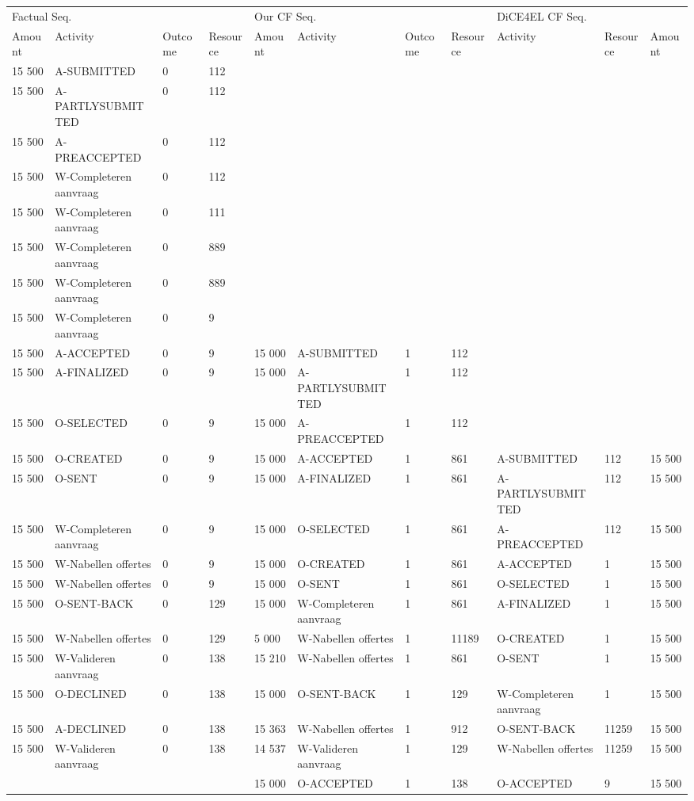 \begin{tabular}{lllllllllll}
\toprule
\multicolumn{4}{l}{Factual Seq.} & \multicolumn{4}{l}{Our CF Seq.} & \multicolumn{3}{l}{DiCE4EL CF Seq.} \\
Amount & Activity & Outcome & Resource & Amount & Activity & Outcome & Resource & Activity & Resource & Amount \\
\midrule
15 500 & A-SUBMITTED & 0 & 112 &  &  &  &  &  &  &  \\
15 500 & A-PARTLYSUBMITTED & 0 & 112 &  &  &  &  &  &  &  \\
15 500 & A-PREACCEPTED & 0 & 112 &  &  &  &  &  &  &  \\
15 500 & W-Completeren aanvraag & 0 & 112 &  &  &  &  &  &  &  \\
15 500 & W-Completeren aanvraag & 0 & 111 &  &  &  &  &  &  &  \\
15 500 & W-Completeren aanvraag & 0 & 889 &  &  &  &  &  &  &  \\
15 500 & W-Completeren aanvraag & 0 & 889 &  &  &  &  &  &  &  \\
15 500 & W-Completeren aanvraag & 0 & 9 &  &  &  &  &  &  &  \\
15 500 & A-ACCEPTED & 0 & 9 & 15 000 & A-SUBMITTED & 1 & 112 &  &  &  \\
15 500 & A-FINALIZED & 0 & 9 & 15 000 & A-PARTLYSUBMITTED & 1 & 112 &  &  &  \\
15 500 & O-SELECTED & 0 & 9 & 15 000 & A-PREACCEPTED & 1 & 112 &  &  &  \\
15 500 & O-CREATED & 0 & 9 & 15 000 & A-ACCEPTED & 1 & 861 & A-SUBMITTED & 112 & 15 500 \\
15 500 & O-SENT & 0 & 9 & 15 000 & A-FINALIZED & 1 & 861 & A-PARTLYSUBMITTED & 112 & 15 500 \\
15 500 & W-Completeren aanvraag & 0 & 9 & 15 000 & O-SELECTED & 1 & 861 & A-PREACCEPTED & 112 & 15 500 \\
15 500 & W-Nabellen offertes & 0 & 9 & 15 000 & O-CREATED & 1 & 861 & A-ACCEPTED & 1 & 15 500 \\
15 500 & W-Nabellen offertes & 0 & 9 & 15 000 & O-SENT & 1 & 861 & O-SELECTED & 1 & 15 500 \\
15 500 & O-SENT-BACK & 0 & 129 & 15 000 & W-Completeren aanvraag & 1 & 861 & A-FINALIZED & 1 & 15 500 \\
15 500 & W-Nabellen offertes & 0 & 129 & 5 000 & W-Nabellen offertes & 1 & 11189 & O-CREATED & 1 & 15 500 \\
15 500 & W-Valideren aanvraag & 0 & 138 & 15 210 & W-Nabellen offertes & 1 & 861 & O-SENT & 1 & 15 500 \\
15 500 & O-DECLINED & 0 & 138 & 15 000 & O-SENT-BACK & 1 & 129 & W-Completeren aanvraag & 1 & 15 500 \\
15 500 & A-DECLINED & 0 & 138 & 15 363 & W-Nabellen offertes & 1 & 912 & O-SENT-BACK & 11259 & 15 500 \\
15 500 & W-Valideren aanvraag & 0 & 138 & 14 537 & W-Valideren aanvraag & 1 & 129 & W-Nabellen offertes & 11259 & 15 500 \\
 &  &  &  & 15 000 & O-ACCEPTED & 1 & 138 & O-ACCEPTED & 9 & 15 500 \\
\bottomrule
\end{tabular}
